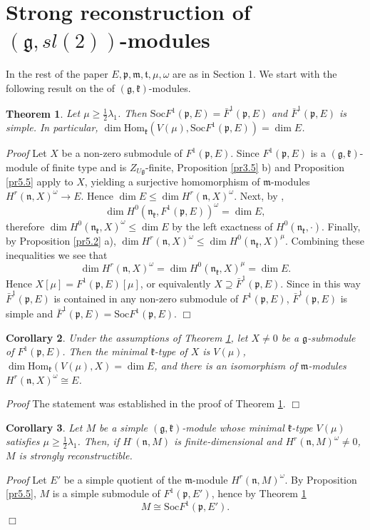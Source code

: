 \documentclass[11pt]{amsart}
\newcounter{theorem}
\newtheorem{theo}{Theorem}[section]
\newtheorem{corollary}[theo]{Corollary}
\renewenvironment{proof}{ \emph{Proof}}{$\Box$}
\renewcommand{\tt}{\mathfrak{t}}
\newcommand{\kk}{\mathfrak{k}}
\newcommand{\nn}{\mathfrak{n}}
\newcommand{\mm}{\mathfrak{m}}
\newcommand{\pp}{\mathfrak{p}}
\renewcommand{\gg}{\mathfrak{g}}
\newcommand{\refth}[1]{Theorem \ref{#1}}
\newcommand{\refprop}[1]{Proposition \ref{#1}}
\newcommand{\Soc}{\mathrm{Soc}}
\newcommand{\Hom}{\mathrm{Hom}}
\begin{document}
\section{Strong reconstruction of $(\gg,sl(2))$-modules}

In the rest of the paper $E,\pp,\mm,\tt,\mu,\omega$ are as in Section 1. We start with the following result on the  of $(\gg,\kk)$-modules. 
\begin{theo}\label{th6.1}
Let $\mu\geq\frac{1}{2}\lambda_1$. Then $\Soc F^1(\pp,E)=\bar{F}^1(\pp,E)$ and $\bar{F}^1(\pp,E)$ is simple. In particular, $\dim\Hom_\kk(V(\mu),\Soc F^1(\pp,E))=\dim E$.
\end{theo}
\begin{proof}
Let $X$ be a non-zero submodule of $F^1(\pp,E)$. Since $F^1(\pp,E)$ is a $(\gg,\kk)$-module of finite type and is $Z_{U\gg}$-finite, \refprop{pr3.5} b) and \refprop{pr5.5} apply to $X$, yielding a surjective homomorphism of $\mm$-modules $H^r(\nn,X)^\omega\rightarrow E$. Hence $\dim E\leq \dim H^r(\nn,X)^\omega$. Next, by \cite{PZ3}, $$\dim H^0(\nn_\kk,F^1(\pp,E))^\omega=\dim E,$$ therefore $\dim H^0(\nn_\kk,X)^\omega\leq\dim E$ by the left exactness of $H^0(\nn_\kk,\cdot)$. Finally, by \refprop{pr5.2} a), $\dim H^r(\nn,X)^\omega\leq\dim H^0(\nn_\kk,X)^\mu$. Combining these inequalities we see that $$\dim H^r(\nn,X)^\omega =\dim H^0(\nn_\kk,X)^\mu =\dim E.$$ Hence $X[ \mu ]=F^1(\pp,E)[ \mu ]$, or equivalently $X\supseteq \bar{F}^1(\pp,E)$.
Since in this way $\bar{F}^1(\pp,E)$ is contained in any non-zero submodule of $F^1(\pp,E)$, $\bar{F}^1(\pp,E)$ is simple and $\bar{F}^1(\pp,E)=\Soc F^1(\pp,E)$.
\end{proof}
\begin{corollary}\label{cor6.2}
Under the assumptions of \refth{th6.1}, let $X\neq 0$ be a $\gg$-submodule of $F^1(\pp,E)$. Then the minimal $\kk$-type of $X$ is $V(\mu)$, $\dim\Hom_\kk(V(\mu),X)=\dim E$, and there is an isomorphism of $\mm$-modules $H^r(\nn,X)^\omega\cong E$.
\end{corollary}
\begin{proof}
The statement was established in the proof of \refth{th6.1}.
\end{proof}
\begin{corollary}\label{cor6.3}
Let $M$ be a simple $(\gg,\kk)$-module whose minimal $\kk$-type $V(\mu)$ satisfies $\mu\geq\frac{1}{2}\lambda_1$. Then, if $H^\cdot(\nn,M)$ is finite-dimensional and $H^r(\nn,M)^\omega\neq 0$, $M$ is strongly reconstructible. 
\end{corollary}
\begin{proof}
Let $E'$ be a simple quotient of the $\mm$-module $H^r(\nn,M)^\omega$. By \refprop{pr5.5}, $M$ is a simple submodule of $F^1(\pp,E')$, hence by \refth{th6.1} $$M\cong\Soc F^1(\pp,E').$$
\end{proof}
\end{document}
